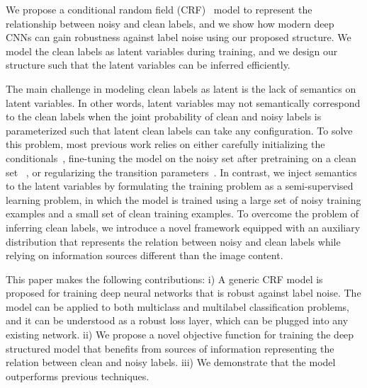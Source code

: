 \documentclass{article}
\begin{document}
We propose a conditional random field (CRF)~\cite{lafferty01CRF} model
to represent the relationship between noisy and clean labels, and we show how modern deep CNNs
can gain robustness against label noise using our proposed structure.
We model the clean labels as latent variables during training,
and we design our structure such that the latent variables can be inferred efficiently.


The main challenge in modeling clean labels as latent is the lack of semantics on latent variables. 
In other words, latent variables may not semantically correspond to the clean labels when the joint probability of clean and noisy labels is 
parameterized such that latent clean labels can take any configuration.  To solve this problem, most previous work relies on either carefully initializing
the conditionals~\cite{Xiao2015}, 
fine-tuning the model on the noisy set after pretraining on a clean set ~\cite{Misra2016}, or
regularizing the transition parameters~\cite{sukhbaatar2014}. In contrast, we inject semantics to the latent variables by formulating the training 
problem as a semi-supervised learning problem, in which the model is 
trained using a large set of noisy training examples and a small set of clean training examples.
To overcome the problem of inferring clean labels, we introduce a novel framework equipped with an auxiliary distribution 
that represents the relation between noisy and clean labels while relying on information sources different than the image content.

This paper makes the following contributions: i) A generic CRF model is proposed for training deep neural networks that is robust against label noise.
The model can be applied to both multiclass and multilabel classification problems, and it can be understood as a robust loss layer, which can be plugged into
any existing network.
ii) We propose a novel objective function for training the deep structured model that benefits from sources of information 
representing the relation between clean and noisy labels.
iii) We demonstrate that the model outperforms previous techniques.
\end{document}
